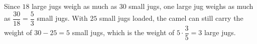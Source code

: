 Since $18$ large jugs weigh as much as $30$ small jugs, one large jug weighs as much as $\dfrac{30}{18}=\dfrac{5}{3}$ small jugs. With $25$ small jugs loaded, the camel can still carry the weight of $30-25=5$ small jugs, which is the weight of $5\cdot\dfrac{3}{5}=\boxed{3}$ large jugs.
